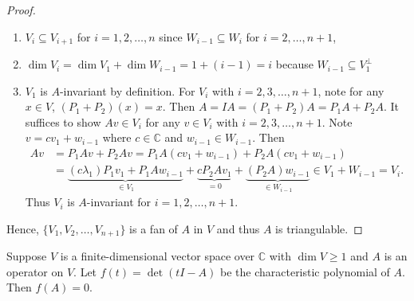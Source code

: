 \documentclass{ctexart}
\newcommand{\C}{\mathbb{C}}
\begin{document}
\begin{proof}
        \begin{enumerate}[label=(\arabic*)]
            \item $V_i \subseteq V_{i+1}$ for $i=1,2,\ldots,n$ since $W_{i-1} \subseteq W_i$ for $i=2,\ldots,n+1$,
            \item $\dim V_i = \dim V_1 + \dim W_{i-1} = 1 + (i-1) = i$ because $W_{i-1} \subseteq V_1^\perp$
            \item $V_1$ is $A$-invariant by definition. For $V_i$ with $i=2,3,\ldots,n+1$, note for any $x\in V$, $(P_1 + P_2)(x) = x$. Then $A = IA = (P_1 + P_2) A = P_1 A + P_2 A$. It suffices to show $Av \in V_i$ for any $v\in V_i$ with $i=2,3,\ldots,n+1$. Note $v = cv_1 + w_{i-1}$ where $c\in \C$ and $w_{i-1} \in W_{i-1}$. Then
            $$
            \begin{aligned}
                Av &= P_1 A v + P_2 A v = P_1 A (cv_1 + w_{i-1}) + P_2 A (cv_1 + w_{i-1}) \\
                &= \underbrace{(c\lambda_1)P_1 v_1 + P_1 A w_{i-1}}_{\in V_1} + \underbrace{c P_2 A v_1}_{=0} + \underbrace{(P_2 A) w_{i-1}}_{\in W_{i-1}} \in V_1 + W_{i-1} = V_i.
            \end{aligned}
            $$
            Thus $V_i$ is $A$-invariant for $i=1,2,\ldots,n+1$.
        \end{enumerate}
        Hence, $\{ V_1, V_2, \ldots, V_{n+1} \}$ is a fan of $A$ in $V$ and thus $A$ is triangulable. 
    \end{proof}
    \begin{mythm}
        Suppose $V$ is a finite-dimensional vector space over $\C$ with $\dim V\ge 1$ and $A$ is an operator on $V$. Let $f(t) = \det (tI - A)$ be the characteristic polynomial of $A$. Then $f(A) = 0$.
        
    \end{mythm}
\end{document}
